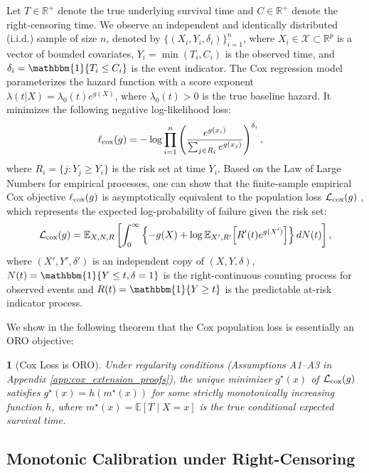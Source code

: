 \documentclass[11pt]{article}
\theoremstyle{plain}
\theoremstyle{plain}
\theoremstyle{plain}
\theoremstyle{plain}
\newtheorem{theorem}{\protect\theoremname}
\theoremstyle{plain}
\theoremstyle{plain}
\theoremstyle{plain}
\providecommand{\theoremname}{Theorem}
\begin{document}
{Let $T \in \mathbb{R}^+$ denote the true underlying survival time and $C \in \mathbb{R}^+$ denote the right-censoring time. We observe an independent and identically distributed (i.i.d.) sample of size $n$, denoted by $  \{(X_i, Y_i, \delta_i)\}_{i=1}^n$, where $X_i \in \mathcal{X} \subset \mathbb{R}^p$ is a vector of bounded covariates, $Y_i = \min(T_i, C_i)$ is the observed time, and $\delta_i = \mathbbm{1}\{T_i \le C_i\}$ is the event indicator.  The Cox regression model parameterizes the hazard function with a  score exponent $\lambda(t|X) = \lambda_0(t) e^{g(X)}$, where $\lambda_0(t) > 0$ is the true baseline hazard. It minimizes the following negative log-likelihood loss:
\begin{align}
\ell_{\textup{cox}}(g)
&= - \log \prod_{i=1}^n
\left(
\frac{e^{g(x_i)}}{\sum_{j \in R_i} e^{g(x_j)}}
\right)^{\delta_i},
\end{align}
where $R_{i}=\{j:Y_{j}\geq Y_{i}\}$ is the risk set at time $Y_{i}$. Based on the Law of Large Numbers for empirical processes, one can show that the finite-sample empirical Cox objective   $\ell_{\textup{cox}}(g)$ is asymptotically equivalent to the population loss $\mathcal{L}_{\textup{cox}}(g)$ \citep{andersen1982cox}, which represents the expected log-probability of failure given the risk set:
\begin{equation}
\label{eq:pop_cox_loss_app}
    \mathcal{L}_{\textup{cox}}(g) = \mathbb{E}_{X, N, R} \left[ \int_0^\infty \left\{ -g(X) + \log \mathbb{E}_{X', R'} \Big[ R'(t) e^{g(X')} \Big] \right\} dN(t) \right],
\end{equation}
where $(X', Y', \delta')$ is an independent copy of $(X, Y, \delta)$,   
$N(t) = \mathbbm{1}\{Y \le t, \delta=1\}$ is the right-continuous counting process for observed events and $R(t) = \mathbbm{1}\{Y \ge t\}$ is the predictable at-risk indicator process. 

We show in the following theorem that the Cox population loss is essentially an ORO objective:
\begin{theorem}[Cox Loss is ORO]
\label{thm:cox_oro}
Under regularity conditions (Assumptions A1--A3 in Appendix \ref{app:cox_extension_proofs}), the unique minimizer $g^\star(x)$ of $\mathcal{L}_{\textup{cox}}(g)$ satisfies $g^\star(x) = h(m^\star(x))$ for some strictly monotonically increasing function $h$, where $m^\star(x) = \mathbb{E}[T \mid X=x]$ is the true conditional expected survival time.  
\end{theorem}

\subsection{Monotonic Calibration under Right-Censoring}

}
\end{document}
